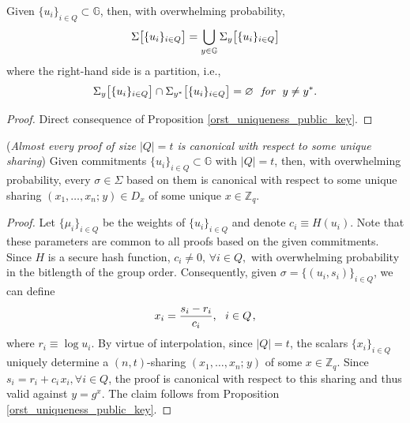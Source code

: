 \documentclass{iacrtrans}
\begin{document}
\begin{cor}\label{orst_validity_classes_prop}
Given $\{u_i\}_{i \in Q} \subset \mathbb{G}$,
then, with overwhelming probability,
\vspace{5pt}
\begin{equation}\label{orst_validity_classes_union}
\Sigma\big[\{u_i\}_{i \in Q}\big]
=
\bigcup_{y \in \mathbb{G}} \Sigma_y\big[\{u_i\}_{i \in Q}\big]
\vspace{3pt}
\end{equation}
where the right-hand side is a partition, i.e.,
\vspace{7pt}
\begin{equation*}
\Sigma_y\big[\{u_i\}_{i \in Q}\big]
\cap
\Sigma_{y^*}\big[\{u_i\}_{i \in Q}\big]
= \varnothing
\ \textit{ for }\ y \neq y^*.
\vspace{7pt}
\end{equation*}
\end{cor}

\begin{proof}
Direct consequence of Proposition \ref{orst_uniqueness_public_key}.
\end{proof}

\begin{prop}\label{orst_uniqueness_sharing}
\textup{(\textit{Almost every proof of size $|Q| = t$
is canonical with respect to some unique sharing})}
Given commitments
$\{u_i\}_{i \in Q} \subset \mathbb{G}$ with $|Q| = t$,
then, with overwhelming probability,
every $\sigma \in \Sigma$ based on them
is canonical with respect to some unique sharing
$(x_1, \dots, x_n;\hspace{1pt} y) \in D_x$
of some unique $x \in \mathbb{Z}_q$.
\end{prop}

\begin{proof}
Let $\{\mu_i\}_{i \in Q}$
be the weights of $\{u_i\}_{i \in Q}$
and denote $c_i \equiv H(u_i)$.
Note that these parameters
are common to all proofs based on the
given commitments.
Since $H$ is a secure hash function,
$c_i \neq 0,\hspace{2pt} \forall i \in Q,$
with overwhelming probability in
the bitlength of the group order.
Consequently, given $\sigma = \{(u_i, s_i)\}_{i \in Q}$,
we can define
\vspace{5pt}
\begin{equation*}
x_i = \frac{s_i - r_i}{c_i},
\ \ i \in Q\hspace{1pt},
\vspace{5pt}
\end{equation*}
where $r_i \equiv \log u_i$.
By virtue of interpolation,
since $|Q| = t$, the scalars $\{x_i\}_{i \in Q}$
uniquely determine a $(n, t)$-sharing
$(x_1, \dots, x_n;\hspace{1pt} y)$
of some $x \in \mathbb{Z}_q$.
Since $s_i = r_i + c_i\hspace{1pt}x_i,\forall i \in Q$,
the proof is canonical with respect to this sharing
and thus valid against $y = g ^ x$.
The claim follows from Proposition \ref{orst_uniqueness_public_key}.
\end{proof}
\end{document}
